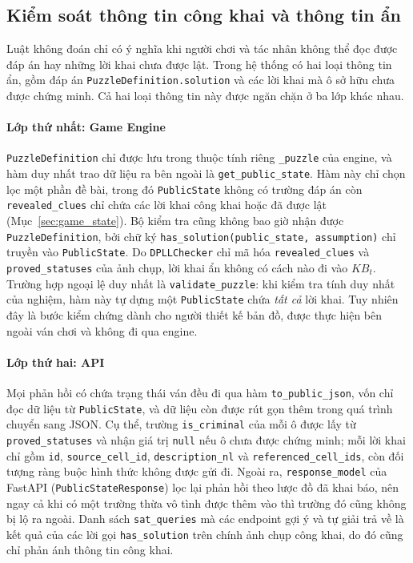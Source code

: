 \subsection{Kiểm soát thông tin công khai và thông tin ẩn}
\label{sec:information_visibility}
\begin{sloppypar}

Luật không đoán chỉ có ý nghĩa khi người chơi và tác nhân không thể đọc được đáp
án hay những lời khai chưa được lật. Trong hệ thống có hai loại thông tin ẩn,
gồm đáp án \texttt{PuzzleDefinition.solution} và các lời khai mà ô sở hữu chưa
được chứng minh. Cả hai loại thông tin này được ngăn chặn ở ba lớp khác nhau.

\paragraph{Lớp thứ nhất: Game Engine}
\texttt{PuzzleDefinition} chỉ được lưu trong thuộc tính riêng \texttt{\_puzzle}
của engine, và hàm duy nhất trao dữ liệu ra bên ngoài là
\texttt{get\_public\_state}. Hàm này chỉ chọn lọc một phần đề bài, trong đó
\texttt{PublicState} không có trường đáp án còn \texttt{revealed\_clues} chỉ chứa
các lời khai công khai hoặc đã được lật (Mục~\ref{sec:game_state}). Bộ kiểm tra
cũng không bao giờ nhận được \texttt{PuzzleDefinition}, bởi chữ ký
\texttt{has\_solution(public\_state, assumption)} chỉ truyền vào
\texttt{PublicState}. Do \texttt{DPLLChecker} chỉ mã hóa
\texttt{revealed\_clues} và \texttt{proved\_statuses} của ảnh chụp, lời khai ẩn
không có cách nào đi vào $\mathit{KB}_t$. Trường hợp ngoại lệ duy nhất là
\texttt{validate\_puzzle}: khi kiểm tra tính duy nhất của nghiệm, hàm này tự dựng
một \texttt{PublicState} chứa \emph{tất cả} lời khai. Tuy nhiên đây là bước kiểm
chứng dành cho người thiết kế bản đồ, được thực hiện bên ngoài ván chơi và không
đi qua engine.

\paragraph{Lớp thứ hai: API}
Mọi phản hồi có chứa trạng thái ván đều đi qua hàm \texttt{to\_public\_json},
vốn chỉ đọc dữ liệu từ \texttt{PublicState}, và dữ liệu còn được rút gọn thêm
trong quá trình chuyển sang JSON. Cụ thể, trường \texttt{is\_criminal} của mỗi ô
được lấy từ \texttt{proved\_statuses} và nhận giá trị \texttt{null} nếu ô chưa
được chứng minh; mỗi lời khai chỉ gồm \texttt{id}, \texttt{source\_cell\_id},
\texttt{description\_nl} và \texttt{referenced\_cell\_ids}, còn đối tượng ràng
buộc hình thức không được gửi đi. Ngoài ra, \texttt{response\_model} của FastAPI
(\texttt{PublicStateResponse}) lọc lại phản hồi theo lược đồ đã khai báo, nên
ngay cả khi có một trường thừa vô tình được thêm vào thì trường đó cũng không bị
lộ ra ngoài. Danh sách \texttt{sat\_queries} mà các endpoint gợi ý và tự giải
trả về là kết quả của các lời gọi \texttt{has\_solution} trên chính ảnh chụp
công khai, do đó cũng chỉ phản ánh thông tin công khai.


\end{sloppypar}
